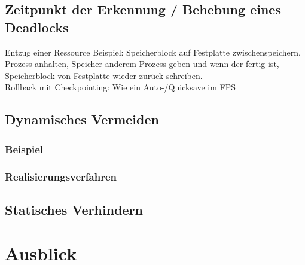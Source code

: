 \subsection{Zeitpunkt der Erkennung / Behebung eines Deadlocks}
Entzug einer Ressource Beispiel: Speicherblock auf Festplatte zwischenspeichern, Prozess anhalten, Speicher anderem Prozess geben und wenn der fertig ist, Speicherblock von Festplatte wieder zurück schreiben.\\
Rollback mit Checkpointing: Wie ein Auto-/Quicksave im FPS 

\subsection{Dynamisches Vermeiden}
\subsubsection*{Beispiel}
\subsubsection{Realisierungsverfahren}

\subsection{Statisches Verhindern}

\section{Ausblick}


